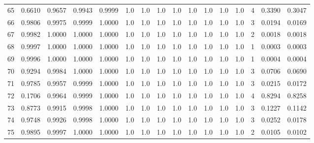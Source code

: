 \begin{tabular}{lrrrrrrrrrrrrrrr}
65  &      0.6610 &  0.9657 &  0.9943 &  0.9999 &     1.0 &     1.0 &     1.0 &     1.0 &     1.0 &     1.0 &      1.0 &        1.0 &      4 &                    0.3390 &                     0.3047 \\
66  &      0.9806 &  0.9975 &  0.9999 &  1.0000 &     1.0 &     1.0 &     1.0 &     1.0 &     1.0 &     1.0 &      1.0 &        1.0 &      3 &                    0.0194 &                     0.0169 \\
67  &      0.9982 &  1.0000 &  1.0000 &  1.0000 &     1.0 &     1.0 &     1.0 &     1.0 &     1.0 &     1.0 &      1.0 &        1.0 &      2 &                    0.0018 &                     0.0018 \\
68  &      0.9997 &  1.0000 &  1.0000 &  1.0000 &     1.0 &     1.0 &     1.0 &     1.0 &     1.0 &     1.0 &      1.0 &        1.0 &      1 &                    0.0003 &                     0.0003 \\
69  &      0.9996 &  1.0000 &  1.0000 &  1.0000 &     1.0 &     1.0 &     1.0 &     1.0 &     1.0 &     1.0 &      1.0 &        1.0 &      1 &                    0.0004 &                     0.0004 \\
70  &      0.9294 &  0.9984 &  1.0000 &  1.0000 &     1.0 &     1.0 &     1.0 &     1.0 &     1.0 &     1.0 &      1.0 &        1.0 &      3 &                    0.0706 &                     0.0690 \\
71  &      0.9785 &  0.9957 &  0.9999 &  1.0000 &     1.0 &     1.0 &     1.0 &     1.0 &     1.0 &     1.0 &      1.0 &        1.0 &      3 &                    0.0215 &                     0.0172 \\
72  &      0.1706 &  0.9964 &  0.9999 &  1.0000 &     1.0 &     1.0 &     1.0 &     1.0 &     1.0 &     1.0 &      1.0 &        1.0 &      4 &                    0.8294 &                     0.8258 \\
73  &      0.8773 &  0.9915 &  0.9998 &  1.0000 &     1.0 &     1.0 &     1.0 &     1.0 &     1.0 &     1.0 &      1.0 &        1.0 &      3 &                    0.1227 &                     0.1142 \\
74  &      0.9748 &  0.9926 &  0.9998 &  1.0000 &     1.0 &     1.0 &     1.0 &     1.0 &     1.0 &     1.0 &      1.0 &        1.0 &      3 &                    0.0252 &                     0.0178 \\
75  &      0.9895 &  0.9997 &  1.0000 &  1.0000 &     1.0 &     1.0 &     1.0 &     1.0 &     1.0 &     1.0 &      1.0 &        1.0 &      2 &                    0.0105 &                     0.0102 \\

\end{tabular}
